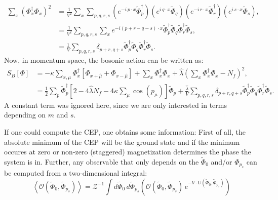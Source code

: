 % 
\begin{align}
 \sum\limits_{x} \left( \Phi_x^{\dagger} \Phi_x \right)^2 &= 
                     \frac{1}{V^2}  \sum\limits_{x}  \sum\limits_{p,q,r,s}  
                     \left( e^{-i\, p \cdot x}  \tilde\Phi_p^{\dagger} \right) \left( e^{i\, q \cdot x}  \tilde\Phi_{q} \right)
                     \left( e^{-i\, r \cdot x}  \tilde\Phi_r^{\dagger} \right) \left( e^{i\, s \cdot x}  \tilde\Phi_{s} \right), \nonumber \\
                  &= \frac{1}{V^2}  \sum\limits_{p,q,r,s}  
                     \sum\limits_{x}  e^{ -i (p + r - q - s) \cdot x }  \tilde\Phi_p^{\dagger} \tilde\Phi_q \tilde\Phi_r^{\dagger} \tilde\Phi_s,
                     \nonumber \\
                  &= \frac{1}{V}\sum\limits_{p,q,r,s} \delta_{p+r,q+s} \tilde\Phi_p^{\dagger} \tilde\Phi_q \tilde\Phi_r^{\dagger} \tilde\Phi_s 
                      \label{eq:FourierTrafoPhiToTheFour}.
\end{align}
%
Now, in momentum space, the bosonic action can be written as:
\begin{align}
 S_B[\Phi] &= -\kappa  \sum\limits_{x,\mu}  \Phi_x^{\dagger}  \left[ \Phi_{x+\hat\mu} + \Phi_{x-\hat\mu} \right] 
              + \sum\limits_x \Phi_x^{\dagger} \Phi_x 
              + \hat{\lambda} \left( \sum\limits_x \Phi_x^{\dagger} \Phi_x - N_f\right)^2, \nonumber \\
           &=  \frac{1}{2}  \sum\limits_{p}  \tilde\Phi_p^{\dagger}  
              \left[ 2 - 4 \hat\lambda N_f - 4 \kappa \sum_{\mu} \cos(p_{\mu}) \right]  \tilde\Phi_p
              + \frac{\hat\lambda}{V} \sum\limits_{p,q,r,s} \delta_{p+r,q+s} \tilde\Phi_p^{\dagger} \tilde\Phi_q \tilde\Phi_r^{\dagger} \tilde\Phi_s .
\end{align}
A constant term was ignored here, since we are only interested in terms depending on $m$ and $s$.
%
% 

If one could compute the CEP, one obtains some information: First of all, the absolute minimum of the CEP will be the ground state and if the 
minimum occures at zero or non-zero (staggered) magnetization determines the phase the system is in. Further, any observable that only depends on 
the $\tilde \Phi_0$ and/or $\Phi_{p_s}$ can be computed from a two-dimensional integral:
\begin{equation}\label{eq:obsFromCEP}
 \left< \mathcal{O}(\tilde \Phi_0,\tilde \Phi_{p_s}) \right > = 
      \mathcal{Z}^{-1} \int d \tilde \Phi_0\, d \tilde \Phi_{p_s} 
      \left( \mathcal{O}(\tilde \Phi_0,\tilde \Phi_{p_s})\, e^{-V\cdot U(\tilde \Phi_0,\tilde \Phi_{p_s})} \right)
\end{equation}
